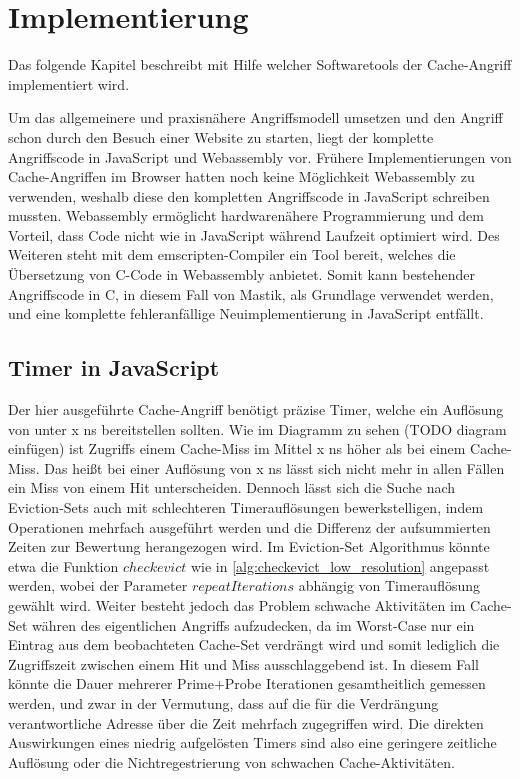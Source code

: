 \chapter{Implementierung}
\label{chapter:preparation}

Das folgende Kapitel beschreibt mit Hilfe welcher Softwaretools der Cache-Angriff implementiert wird.

Um das allgemeinere und praxisnähere Angriffsmodell umsetzen und den Angriff schon durch den Besuch einer Website zu starten, liegt der komplette Angriffscode in JavaScript und Webassembly vor. Frühere Implementierungen von Cache-Angriffen im Browser \cite{TheSpyInTheSandbox} hatten noch keine Möglichkeit Webassembly zu verwenden, weshalb diese den kompletten Angriffscode in JavaScript schreiben mussten. Webassembly ermöglicht hardwarenähere Programmierung und dem Vorteil, dass Code nicht wie in JavaScript während Laufzeit optimiert wird. Des Weiteren steht mit dem emscripten-Compiler ein Tool bereit, welches die Übersetzung von C-Code in Webassembly anbietet. Somit kann bestehender Angriffscode in C, in diesem Fall von Mastik, als Grundlage verwendet werden, und eine komplette fehleranfällige Neuimplementierung in JavaScript entfällt.


\section{Timer in JavaScript}

Der hier ausgeführte Cache-Angriff benötigt präzise Timer, welche ein Auflösung von unter x ns bereitstellen sollten. Wie im Diagramm zu sehen (TODO diagram einfügen) ist Zugriffs einem Cache-Miss im Mittel x ns höher als bei einem Cache-Miss. Das heißt bei einer Auflösung von x ns lässt sich nicht mehr in allen Fällen ein Miss von einem Hit unterscheiden. Dennoch lässt sich die Suche nach Eviction-Sets auch mit schlechteren Timerauflösungen bewerkstelligen, indem Operationen mehrfach ausgeführt werden und die Differenz der aufsummierten Zeiten zur Bewertung herangezogen wird. Im Eviction-Set Algorithmus könnte etwa die Funktion $checkevict$ wie in \ref{alg:checkevict_low_resolution} angepasst werden, wobei der Parameter $repeatIterations$ abhängig von Timerauflösung gewählt wird. Weiter besteht jedoch das Problem schwache Aktivitäten im Cache-Set währen des eigentlichen Angriffs aufzudecken, da im Worst-Case nur ein Eintrag aus dem beobachteten Cache-Set verdrängt wird und somit lediglich die Zugriffszeit zwischen einem Hit und Miss ausschlaggebend ist. In diesem Fall könnte die Dauer mehrerer Prime+Probe Iterationen gesamtheitlich gemessen werden, und zwar in der Vermutung, dass auf die für die Verdrängung verantwortliche Adresse über die Zeit mehrfach zugegriffen wird. Die direkten Auswirkungen eines niedrig aufgelösten Timers sind also eine geringere zeitliche Auflösung oder die Nichtregestrierung von schwachen Cache-Aktivitäten.

